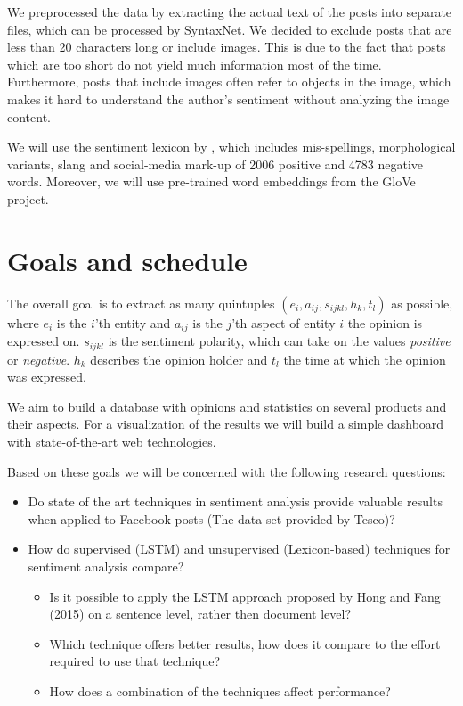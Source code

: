 \documentclass[10pt,a4paper]{article}
\begin{document}
	We preprocessed the data by extracting the actual text of the posts into separate files, which can be processed by SyntaxNet. We decided to exclude posts that are less than 20 characters long or include images. This is due to the fact that posts which are too short do not yield much information most of the time. Furthermore, posts that include images often refer to objects in the image, which makes it hard to understand the author's sentiment without analyzing the image content.
	
	We will use the sentiment lexicon by \cite{Hu:2004:MSC:1014052.1014073}, which includes mis-spellings, morphological variants, slang and social-media mark-up of 2006 positive and 4783 negative words. Moreover, we will use pre-trained word embeddings from the GloVe project.

	\section{Goals and schedule}
	The overall goal is to extract as many quintuples $(e_i, a_{ij}, s_{ijkl}, h_k, t_l)$ as possible, where $e_i$ is the $i$'th entity and $a_{ij}$ is the $j$'th aspect of entity $i$ the opinion is expressed on. $s_{ijkl}$ is the sentiment polarity, which can take on the values \textit{positive} or \textit{negative}. $h_k$ describes the opinion holder and $t_l$ the time at which the opinion was expressed.
	
	We aim to build a database with opinions and statistics on several products and their aspects. For a visualization of the results we will build a simple dashboard with state-of-the-art web technologies.

	Based on these goals we will be concerned with the following research questions:

	\begin{itemize}
	\item Do state of the art techniques in sentiment analysis provide valuable results when applied to Facebook posts (The data set provided by Tesco)?
	\item How do supervised (LSTM) and unsupervised (Lexicon-based) techniques for sentiment analysis compare?
		\begin{itemize}
		\item Is it possible to apply the LSTM approach proposed by Hong and Fang (2015) on a sentence level, rather then document level?
		\item Which technique offers better results, how does it compare to the effort required to use that technique?
		\item How does a combination of the techniques affect performance?
		\end{itemize}
	\end{itemize}

	\newpage

	\nocite{DBLP:journals/corr/AndorAWSPGPC16}
	\nocite{Liu12sentimentanalysis}
	\nocite{Zhang2014}
	\nocite{pennington2014glove}
	\nocite{syntaxnet}
	\nocite{Ding:2008:HLA:1341531.1341561}

	
	
\end{document}
